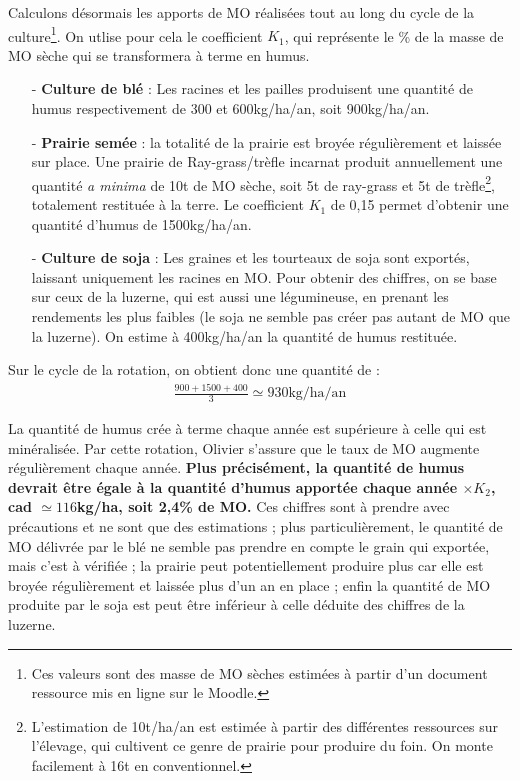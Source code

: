 \documentclass{article}
\begin{document}
Calculons désormais les apports de MO réalisées tout au long du cycle de la culture\footnote{Ces valeurs sont des masse de MO sèches estimées à partir d'un document ressource mis en ligne sur le Moodle.}. On utlise pour cela le coefficient $K_1$, qui représente le \% de la masse de MO sèche qui se transformera à terme en humus. 
\begin{itemize}

	\item[-] \textbf{Culture de blé} : Les racines et les pailles produisent une quantité de humus respectivement de 300 et 600kg/ha/an, soit 900kg/ha/an. 
	\item[-] \textbf{Prairie semée} : la totalité de la prairie est broyée régulièrement et laissée sur place. Une prairie de Ray-grass/trèfle incarnat produit annuellement une quantité \textit{a minima} de 10t de MO sèche, soit 5t de ray-grass et 5t de trèfle\footnote{L'estimation de 10t/ha/an est estimée à partir des différentes ressources sur l'élevage, qui cultivent ce genre de prairie pour produire du foin. On monte facilement à 16t en conventionnel.}, totalement restituée à la terre. Le coefficient $K_1$ de 0,15 permet d'obtenir une quantité d'humus de 1500kg/ha/an. 
	\item[-] \textbf{Culture de soja} : Les graines et les tourteaux de soja sont exportés, laissant uniquement les racines en MO. Pour obtenir des chiffres, on se base sur ceux de la luzerne, qui est aussi une légumineuse, en prenant les rendements les plus faibles (le soja ne semble pas créer pas autant de MO que la luzerne). On estime à 400kg/ha/an la quantité de humus restituée. 

\end{itemize}

Sur le cycle de la rotation, on obtient donc une quantité de :
\begin{align*}
	\frac{900+1500+400}{3}\simeq930\mathrm{kg/ha/an}
\end{align*}

La quantité de humus crée à terme chaque année est supérieure à celle qui est minéralisée. Par cette rotation, Olivier s'assure que le taux de MO augmente régulièrement chaque année. \textbf{Plus précisément, la quantité de humus devrait être égale à la quantité d'humus apportée chaque année $\times K_2$, cad $\simeq116$kg/ha, soit 2,4\% de MO.} Ces chiffres sont à prendre avec précautions et ne sont que des estimations ; plus particulièrement, le quantité de MO délivrée par le blé ne semble pas prendre en compte le grain qui exportée, mais c'est à vérifiée ; la prairie peut potentiellement produire plus car elle est broyée régulièrement et laissée plus d'un an en place ; enfin la quantité de MO produite par le soja est peut être inférieur à celle déduite des chiffres de la luzerne.
\end{document}
